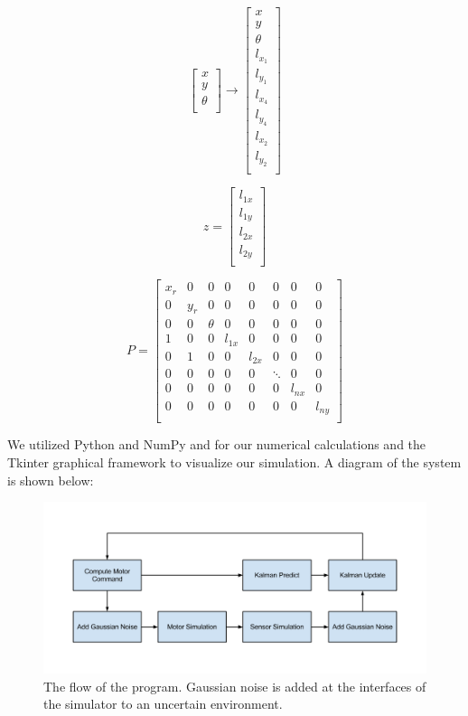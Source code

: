 \documentclass[prodmode,acmtecs]{acmsmall} %
\begin{document}
$$
\begin{bmatrix}
    x \\
    y \\
    \theta \\
\end{bmatrix}
\rightarrow
\begin{bmatrix}
    x \\
    y \\
    \theta \\
    l_{x_1} \\
    l_{y_1} \\
    l_{x_4} \\
    l_{y_4} \\
    l_{x_2} \\
    l_{y_2} \\
\end{bmatrix}
$$

$$
z = 
\begin{bmatrix}
    l_{1x} \\
    l_{1y} \\
    l_{2x} \\
    l_{2y} \\
\end{bmatrix}
$$

$$
P =
\begin{bmatrix}
    x_r & 0 & 0 & 0 & 0 & 0 & 0 & 0 \\
    0 & y_r & 0 & 0 & 0 & 0 & 0 & 0 \\
    0 & 0 & \theta & 0 & 0 & 0 & 0 & 0 \\
    1 & 0 & 0 & l_{1x} & 0 & 0 & 0 & 0 \\
    0 & 1 & 0 & 0 & l_{2x} & 0 & 0 & 0 \\
    0 & 0 & 0 & 0 & 0 & \ddots & 0 & 0 \\
    0 & 0 & 0 & 0 & 0 & 0 & l_{nx} & 0 \\
    0 & 0 & 0 & 0 & 0 & 0 & 0 & l_{ny} \\
\end{bmatrix}
$$

We utilized Python and NumPy and for our numerical calculations and the Tkinter graphical framework to visualize our simulation. A diagram of the system is shown below:

\begin{figure}[h!]
\includegraphics[width=\textwidth]{systemdiagram.png}
\caption{The flow of the program. Gaussian noise is added at the interfaces of the simulator to an uncertain environment.}
\end{figure}
\end{document}
